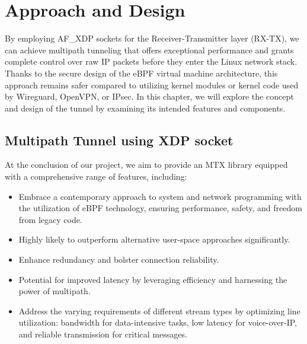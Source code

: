 \chapter{Approach and Design}\label{sec:approach_design}\minitoc\vspace{.5cm}

By employing AF\_XDP sockets for the Receiver-Transmitter layer (RX-TX), we can achieve multipath tunneling that offers exceptional performance and grants complete control over raw IP packets before they enter the Linux network stack. 
Thanks to the secure design of the eBPF virtual machine architecture, this approach remains safer compared to utilizing kernel modules or kernel code used by Wireguard, OpenVPN, or IPsec.
In this chapter, we will explore the concept and design of the tunnel by examining its intended features and components.

\section{Multipath Tunnel using XDP socket}
At the conclusion of our project, we aim to provide an MTX library equipped with a comprehensive range of features, including:

\begin{itemize}
	\item Embrace a contemporary approach to system and network programming with the utilization of eBPF technology, ensuring performance, safety, and freedom from legacy code.
	\item Highly likely to outperform alternative user-space approaches significantly.
	\item Enhance redundancy and bolster connection reliability.
	\item Potential for improved latency by leveraging efficiency and harnessing the power of multipath.
	\item Address the varying requirements of different stream types by optimizing line utilization: bandwidth for data-intensive tasks, low latency for voice-over-IP, and reliable transmission for critical messages.
\end{itemize}

